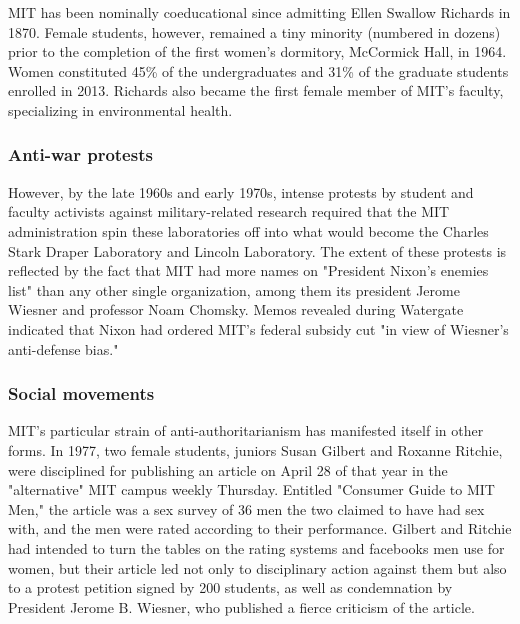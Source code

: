 MIT has been nominally coeducational since admitting Ellen Swallow Richards in 1870. Female students, however, remained a tiny minority (numbered in dozens) prior to the completion of the first women's dormitory, McCormick Hall, in 1964. Women constituted 45\% of the undergraduates and 31\% of the graduate students enrolled in 2013. Richards also became the first female member of MIT's faculty, specializing in environmental health.

\subsubsection{Anti-war protests}

However, by the late 1960s and early 1970s, intense protests by student and faculty activists against military-related research required that the MIT administration spin these laboratories off into what would become the Charles Stark Draper Laboratory and Lincoln Laboratory. The extent of these protests is reflected by the fact that MIT had more names on "President Nixon's enemies list" than any other single organization, among them its president Jerome Wiesner and professor Noam Chomsky. Memos revealed during Watergate indicated that Nixon had ordered MIT's federal subsidy cut "in view of Wiesner's anti-defense bias."

\subsubsection {Social movements}

MIT's particular strain of anti-authoritarianism has manifested itself in other forms. In 1977, two female students, juniors Susan Gilbert and Roxanne Ritchie, were disciplined for publishing an article on April 28 of that year in the "alternative" MIT campus weekly Thursday. Entitled "Consumer Guide to MIT Men," the article was a sex survey of 36 men the two claimed to have had sex with, and the men were rated according to their performance. Gilbert and Ritchie had intended to turn the tables on the rating systems and facebooks men use for women, but their article led not only to disciplinary action against them but also to a protest petition signed by 200 students, as well as condemnation by President Jerome B. Wiesner, who published a fierce criticism of the article.


